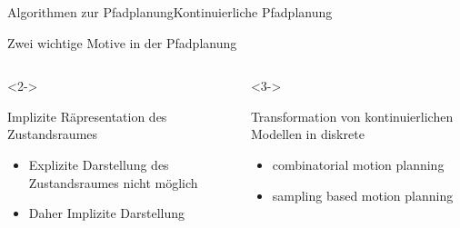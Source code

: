 \documentclass[t,aspectratio=169,dvipsnames]{beamer}
\begin{document}
\begin{frame}{Algorithmen zur Pfadplanung}{Kontinuierliche Pfadplanung}
	\begin{center}
		Zwei wichtige Motive in der Pfadplanung
	\end{center}
	\begin{columns}
		\begin{column}[T]{0.5\textwidth}<2->
			\begin{block}{Implizite Räpresentation des Zustandsraumes}
			\begin{itemize}
				\item Explizite Darstellung des Zustandsraumes nicht möglich
				\item Daher Implizite Darstellung
			\end{itemize}
			\end{block}
		\end{column}
		\begin{column}[T]{0.5\textwidth}<3->
			\begin{block}{Transformation von kontinuierlichen Modellen in diskrete}
			\begin{itemize}
				\item combinatorial motion planning
				\item sampling based motion planning
			\end{itemize}
			\end{block}
		\end{column}
	\end{columns}
\end{frame}
\end{document}
